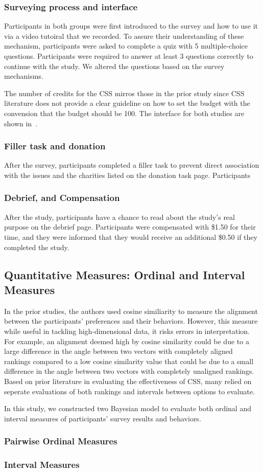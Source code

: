 \subsubsection{Surveying process and interface}
Participants in both groups were first introduced to the survey and how to use it via a video tutoiral that we recorded. To assure their understanding of these mechanism, participants were asked to complete a quiz with 5 multiple-choice questions. Participants were required to answer at least 3 questions correctly to continue with the study. We altered the questions based on the survey mechanisms.

The number of credits for the CSS mirros those in the prior study since CSS literature does not provide a clear guideline on how to set the budget with the convension that the budget should be 100. The interface for both studies are shown in~.

\subsubsection{Filler task and donation}
After the survey, participants completed a filler task to prevent direct association with the issues and the charities listed on the donation task page. Participants 

\subsubsection{Debrief, and Compensation}
After the study, participants have a chance to read about the study's real purpose on the debrief page. Participants were compensated with \$1.50 for their time, and they were informed that they would receive an additional \$0.50 if they completed the study.

\subsection{Quantitative Measures: Ordinal and Interval Measures}
\label{sec:quantitative_measures}
In the prior studies, the authors used cosine similiarity to measure the alignment between the participants' preferences and their behaviors. However, this measure while useful in tackling high-dimensional data, it risks errors in interpretation. For example, an alignment deemed high by cosine similarity could be due to a large difference in the angle between two vectors with completely aligned rankings compared to a low cosine similarity value that could be due to a small difference in the angle between two vectors with completely unaligned rankings. Based on prior literature in evaluating the effectiveness of CSS, many relied on seperate evaluations of both rankings and intervals between options to evaluate.

In this study, we constructed two Bayesian model to evaluate both ordinal and interval measures of participants' survey results and behaviors.

\subsubsection{Pairwise Ordinal Measures}
\label{sec:ordinal_measures}





\subsubsection{Interval Measures}
\label{sec:interval_measures}